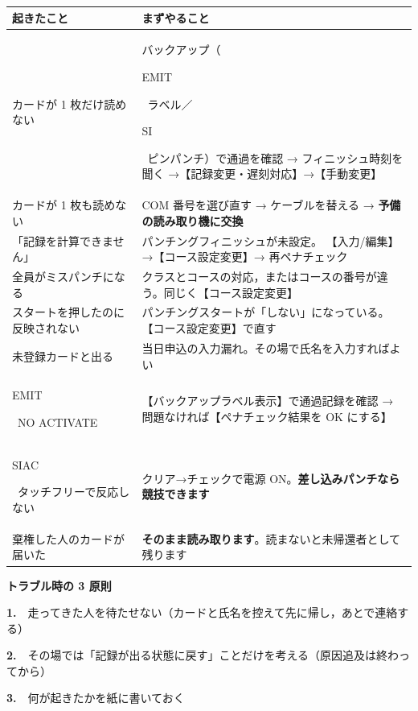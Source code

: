 \documentclass[a4paper,10pt]{ltjsarticle}
\DeclareRobustCommand{\tg}[2]{{\colorbox{#1}{\color{white}\sffamily\bfseries\scriptsize\strut #2}}}
\DeclareRobustCommand{\tSI}{\tg{cSI}{SI}}
\DeclareRobustCommand{\tEMIT}{\tg{cEMIT}{EMIT}}
\DeclareRobustCommand{\tSIAC}{\tg{cSIAC}{SIAC}}
\newcommand{\hd}[1]{\textbf{#1}}
\begin{document}
\begin{center}
\small
\begin{tabular}{@{}P{44mm}P{104mm}@{}}
\toprule
\hd{起きたこと} & \hd{まずやること} \\
\midrule
カードが 1 枚だけ読めない
  & バックアップ（\tEMIT\ ラベル／\tSI\ ピンパンチ）で通過を確認 →
    フィニッシュ時刻を聞く →【記録変更・遅刻対応】→【手動変更】 \\
\midrule
カードが 1 枚も読めない
  & COM 番号を選び直す → ケーブルを替える → \textbf{予備の読み取り機に交換} \\
\midrule
「記録を計算できません」
  & パンチングフィニッシュが未設定。
    【入力/編集】→【コース設定変更】→ 再ペナチェック \\
\midrule
全員がミスパンチになる
  & クラスとコースの対応，またはコースの番号が違う。同じく【コース設定変更】 \\
\midrule
スタートを押したのに反映されない
  & パンチングスタートが「しない」になっている。【コース設定変更】で直す \\
\midrule
未登録カードと出る
  & 当日申込の入力漏れ。その場で氏名を入力すればよい \\
\midrule
\tEMIT\ NO ACTIVATE
  & 【バックアップラベル表示】で通過記録を確認 →
    問題なければ【ペナチェック結果を OK にする】 \\
\midrule
\tSIAC\ タッチフリーで反応しない
  & クリア→チェックで電源 ON。\textbf{差し込みパンチなら競技できます} \\
\midrule
棄権した人のカードが届いた
  & \textbf{そのまま読み取ります}。読まないと未帰還者として残ります \\
\bottomrule
\end{tabular}
\end{center}

\vspace{3mm}
\begin{tcolorbox}[colback=goalbg,colframe=goalfr,boxrule=0.6pt,arc=2pt]
{\sffamily\bfseries トラブル時の 3 原則}\par\vspace{1mm}
\textbf{1.}　走ってきた人を待たせない（カードと氏名を控えて先に帰し，あとで連絡する）\par
\textbf{2.}　その場では「記録が出る状態に戻す」ことだけを考える（原因追及は終わってから）\par
\textbf{3.}　何が起きたかを紙に書いておく\par
\end{tcolorbox}

\clearpage
\end{document}
